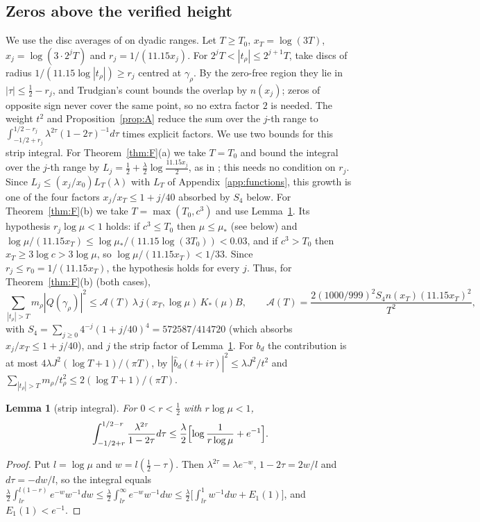 \documentclass[11pt]{amsart}
\newtheorem{lemma}[proposition]{Lemma}
\theoremstyle{remark}
\numberwithin{equation}{section}
\begin{document}
\subsection{Zeros above the verified height}
We use the disc averages of \cite[Lemma~5.1]{MoriWeilII} on dyadic ranges. Let $T\ge T_0$, $x_T=\log(3T)$, $x_j=\log(3\cdot2^jT)$ and $r_j=1/(11.15x_j)$. For $2^jT<|t_\rho|\le2^{j+1}T$, take discs of radius $1/(11.15\log|t_\rho|)\ge r_j$ centred at $\gamma_\rho$. By the zero-free region \cite{MT15} they lie in $|\tau|\le\frac12-r_j$, and Trudgian's count bounds the overlap by $n(x_j)$; zeros of opposite sign never cover the same point, so no extra factor $2$ is needed. The weight $t^2$ and Proposition~\ref{prop:A} reduce the sum over the $j$-th range to $\int_{-1/2+r_j}^{1/2-r_j}\lambda^{2\tau}(1-2\tau)^{-1}d\tau$ times explicit factors. We use two bounds for this strip integral. For Theorem~\ref{thm:F}(a) we take $T=T_0$ and bound the integral over the $j$-th range by $L_j=\frac12+\frac\lambda2\log\frac{11.15x_j}2$, as in \cite[proof of Lemma~5.1]{MoriWeilII}; this needs no condition on $r_j$. Since $L_j\le(x_j/x_0)L_T(\lambda)$ with $L_T$ of Appendix~\ref{app:functions}, this growth is one of the four factors $x_j/x_T\le1+j/40$ absorbed by $S_4$ below. For Theorem~\ref{thm:F}(b) we take $T=\max(T_0,c^3)$ and use Lemma~\ref{lem:strip}. Its hypothesis $r_j\log\mu<1$ holds: if $c^3\le T_0$ then $\mu\le\mu_*$ (see below) and $\log\mu/(11.15x_T)\le\log\mu_*/(11.15\log(3T_0))<0.03$, and if $c^3>T_0$ then $x_T\ge3\log c>3\log\mu$, so $\log\mu/(11.15x_T)<1/33$. Since $r_j\le r_0=1/(11.15x_T)$, the hypothesis holds for every $j$. Thus, for Theorem~\ref{thm:F}(b) (both cases),
\[
\sum_{|t_\rho|>T}m_\rho|Q(\gamma_\rho)|^2\le\mathcal A(T)\,\lambda\,j(x_T,\log\mu)\,K_*(\mu)B,\qquad\mathcal A(T)=\frac{2(1000/999)^2S_4n(x_T)(11.15x_T)^2}{T^2},
\]
with $S_4=\sum_{j\ge0}4^{-j}(1+j/40)^4=572587/414720$ (which absorbs $x_j/x_T\le1+j/40$), and $j$ the strip factor of Lemma~\ref{lem:strip}. For $b_d$ the contribution is at most $4\lambda J^2(\log T+1)/(\pi T)$, by $|\hat b_d(t+i\tau)|^2\le\lambda J^2/t^2$ and $\sum_{|t_\rho|>T}m_\rho/t_\rho^2\le2(\log T+1)/(\pi T)$.

\begin{lemma}[strip integral]\label{lem:strip}
For $0<r<\frac12$ with $r\log\mu<1$,
\[
\int_{-1/2+r}^{1/2-r}\frac{\lambda^{2\tau}}{1-2\tau}d\tau\le\frac\lambda2\Bigl[\log\frac1{r\log\mu}+e^{-1}\Bigr].
\]
\end{lemma}
\begin{proof}
Put $l=\log\mu$ and $w=l(\frac12-\tau)$. Then $\lambda^{2\tau}=\lambda e^{-w}$, $1-2\tau=2w/l$ and $d\tau=-dw/l$, so the integral equals $\frac\lambda2\int_{lr}^{l(1-r)}e^{-w}w^{-1}dw\le\frac\lambda2\int_{lr}^{\infty}e^{-w}w^{-1}dw\le\frac\lambda2\bigl[\int_{lr}^1w^{-1}dw+E_1(1)\bigr]$, and $E_1(1)<e^{-1}$.
\end{proof}
\end{document}
